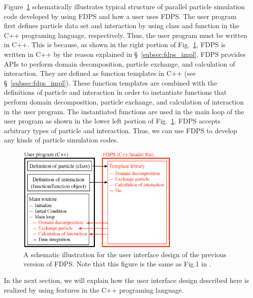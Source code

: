 \documentclass[proof,useamsfonts]{pasj01}
\begin{document}
Figure~\ref{fig:fdps_ui} schematically illustrates typical structure of parallel particle simulation code developed by using FDPS and how a user uses FDPS. The user program first defines particle data set and interaction by using class and function in the C++ programing language, respectively. Thus, the user program must be written in C++. This is because, as shown in the right portion of Fig.~\ref{fig:fdps_ui}, FDPS is written in C++ by the reason explained in \S~\ref{subsec:fdps_impl}. FDPS provides APIs to perform domain decomposition, particle exchange, and calculation of interaction. They are defined as function templates in C++ (see \S~\ref{subsec:fdps_impl}). These function templates are combined with the definitions of particle and interaction in order to instantiate functions that perform domain decomposition, particle exchange, and calculation of interaction in the user program. The instantiated functions are used in the main loop of the user program as shown in the lower left portion of Fig.~\ref{fig:fdps_ui}. FDPS accepts arbitrary types of particle and interaction. Thus, we can use FDPS  to develop any kinds of particle simulation codes. 

\begin{figure}[h]
\begin{center}
\includegraphics[width=8cm]{figures/FDPS_UI}
\end{center}
\caption{A schematic illustration for the user interface design of the previous version of FDPS. Note that this figure is the same as Fig.1 in \citet{iwasawa16:_implem_fdps}.}
\label{fig:fdps_ui}  
\end{figure}

In the next section, we will explain how the user interface design described here is realized by using features in the C++ programing language.


\end{document}
